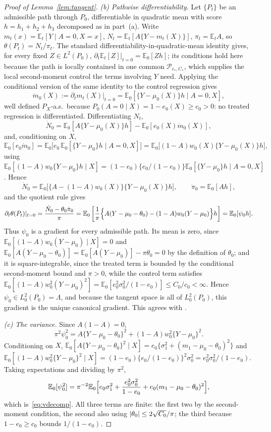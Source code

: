 \documentclass[11pt]{article}
\theoremstyle{plain}
\theoremstyle{definition}
\theoremstyle{remark}
\newcommand{\E}{\mathbb{E}}
\newcommand{\cP}{\mathcal{P}}
\newcommand{\ez}{e_0}
\newcommand{\mz}{\mu_0}
\newcommand{\wz}{w_0}
\DeclarePairedDelimiter{\abs}{\lvert}{\rvert}
\begin{document}
\begin{proof}[Proof of Lemma~\ref{lem:tangent}]
\emph{(b) Pathwise differentiability.} Let $\{P_t\}$ be an admissible path
through $P_0$, differentiable in quadratic mean with score
$h=h_1+h_2+h_3$ decomposed as in part~(a). Write
$m_t(x)=\E_t[Y\mid A=0,X=x]$, $N_t=\E_t[A\{Y-m_t(X)\}]$, $\pi_t=\E_tA$, so
$\theta(P_t)=N_t/\pi_t$. The standard differentiability-in-quadratic-mean
identity gives, for every fixed $Z\in L^2(P_0)$,
$\partial_t\E_t[Z]\vert_{t=0}=\E_0[Zh]$; its conditions hold here because the
path is locally contained in one common $\cP_{c_*,C_*}$, which supplies the
local second-moment control the terms involving $Y$ need. Applying the
conditional version of the same identity to the control regression gives
\[
  \dot m_0(X):=\partial_tm_t(X)\vert_{t=0}=\E_0[\{Y-\mz(X)\}h\mid A=0,X],
\]
well defined $P_X$-a.s.\ because $P_0(A=0\mid X)=1-\ez(X)\ge c_0>0$: no
treated regression is differentiated. Differentiating $N_t$,
\[
  \dot N_0
  =\E_0[A\{Y-\mz(X)\}h]-\E_0[\ez(X)\dot m_0(X)],
\]
and, conditioning on $X$,
\[
  \E_0[\ez\dot m_0]
  =\E_0\bigl[\ez\,\E_0[\{Y-\mz\}h\mid A=0,X]\bigr]
  =\E_0\bigl[(1-A)\wz(X)\{Y-\mz(X)\}h\bigr],
\]
using $\E_0[(1-A)\wz\{Y-\mz\}h\mid X]=(1-\ez)\{\ez/(1-\ez)\}
\E_0[\{Y-\mz\}h\mid A=0,X]$. Hence
\[
  \dot N_0=\E_0\bigl[\{A-(1-A)\wz(X)\}\{Y-\mz(X)\}h\bigr],
  \qquad
  \dot\pi_0=\E_0[Ah],
\]
and the quotient rule gives
\[
  \partial_t\theta(P_t)\vert_{t=0}
  =\frac{\dot N_0-\theta_0\dot\pi_0}{\pi}
  =\E_0\left[\frac1\pi\Bigl\{A(Y-\mz-\theta_0)-(1-A)\wz(Y-\mz)\Bigr\}h\right]
  =\E_0[\psi_0h].
\]
Thus $\psi_0$ is a gradient for every admissible path. Its mean is zero,
since $\E_0[(1-A)\wz(Y-\mz)\mid X]=0$ and
$\E_0[A(Y-\mz-\theta_0)]=\E_0[A(Y-\mz)]-\pi\theta_0=0$ by the definition of
$\theta_0$; and it is square-integrable, since the treated term is bounded
by the conditional second-moment bound and $\pi>0$, while the control term
satisfies $\E_0[(1-A)\wz^2(Y-\mz)^2]=\E_0[\ez^2\sigma_0^2/(1-\ez)]\le
C_0/c_0<\infty$. Hence $\psi_0\in L_0^2(P_0)=\Lambda$, and because the
tangent space is all of $L_0^2(P_0)$, this gradient is the unique canonical
gradient. This agrees with \citet{hahn1998}.

\emph{(c) The variance.} Since $A(1-A)=0$,
\[
  \pi^2\psi_0^2=A\{Y-\mz-\theta_0\}^2+(1-A)\wz^2\{Y-\mz\}^2 .
\]
Conditioning on $X$,
$\E_0[A\{Y-\mz-\theta_0\}^2\mid X]=\ez\{\sigma_1^2+(m_1-\mz-\theta_0)^2\}$ and
$\E_0[(1-A)\wz^2\{Y-\mz\}^2\mid X]=(1-\ez)\{\ez/(1-\ez)\}^2\sigma_0^2
=\ez^2\sigma_0^2/(1-\ez)$. Taking expectations and dividing by $\pi^2$,
\[
  \E_0[\psi_0^2]
  =\pi^{-2}\E_0\Bigl[\ez\sigma_1^2+\frac{\ez^2\sigma_0^2}{1-\ez}
   +\ez(m_1-\mz-\theta_0)^2\Bigr],
\]
which is~\eqref{eq:vdecomp}. All three terms are finite: the first two by
the second-moment condition, the second also using
$\abs{\theta_0}\le2\sqrt{C_0}/\pi$; the third because $1-\ez\ge c_0$ bounds
$1/(1-\ez)$.
\end{proof}
\end{document}
